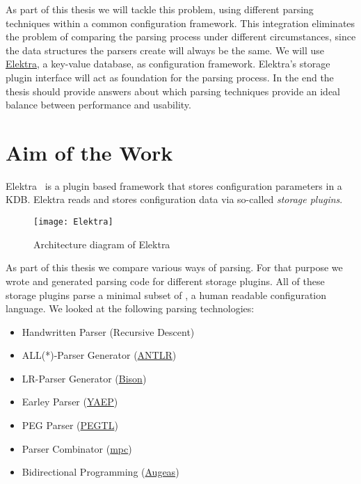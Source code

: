 As part of this thesis we will tackle this problem, using different parsing techniques within a common configuration framework. This integration eliminates the problem of comparing the parsing process under different circumstances, since the data structures the parsers create will always be the same. We will use \href{http://web.libelektra.org}{Elektra}, a key-value database, as configuration framework. Elektra’s storage plugin interface will act as foundation for the parsing process. In the end the thesis should provide answers about which parsing techniques provide an ideal balance between performance and usability.

\section{Aim of the Work}
\label{sec:aim_of_the_work}

Elektra~\cite{raab2010modular, raab2017context} is a plugin based framework that stores configuration parameters in a \gls{KDB}. Elektra reads and stores configuration data via so-called \emph{storage plugins}.

\begin{figure}[H]
  \centering
    \texttt{[image: Elektra]}
  \caption{Architecture diagram of Elektra}
\end{figure}

As part of this thesis we compare various ways of parsing. For that purpose we wrote and generated parsing code for different storage plugins. All of these storage plugins parse a minimal subset of , a human readable configuration language. We looked at the following parsing technologies:

\begin{itemize}
  \item Handwritten Parser (Recursive Descent)
  \item ALL(*)-Parser Generator (\href{http://www.antlr.org}{ANTLR})
  \item LR-Parser Generator (\href{https://www.gnu.org/software/bison}{Bison})
  \item Earley Parser (\href{https://github.com/vnmakarov/yaep}{YAEP})
  \item PEG Parser (\href{https://github.com/taocpp/PEGTL}{PEGTL})
  \item Parser Combinator (\href{https://github.com/orangeduck/mpc}{mpc})
  \item Bidirectional Programming (\href{http://augeas.net}{Augeas})
\end{itemize}

